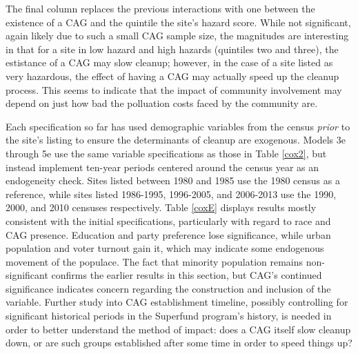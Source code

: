 \documentclass[12pt]{article}
\begin{document}
{The final column replaces the previous interactions with one between the existence of a CAG and the quintile the site's hazard score. While not significant, again likely due to such a small CAG sample size, the magnitudes are interesting in that for a site in low hazard and high hazards (quintiles two and three), the estistance of a CAG may slow cleanup; however, in the case of a site listed as very hazardous, the effect of having a CAG may actually speed up the cleanup process. This seems to indicate that the impact of community involvement may depend on just how bad the polluation costs faced by the community are. 












Each specification so far has used demographic variables from the census \emph{prior} to the site's listing to ensure the determinants of cleanup are exogenous. Models 3e through 5e use the same variable specifications as those in Table \ref{cox2}, but instead implement ten-year periods centered around the census year as an endogeneity check. Sites listed between 1980 and 1985 use the 1980 census as a reference, while sites listed 1986-1995, 1996-2005, and 2006-2013 use the 1990, 2000, and 2010 censuses respectively. Table \ref{coxE} displays results mostly consistent with the initial specifications, particularly with regard to race and CAG presence. Education and party preference lose significance, while urban population and voter turnout gain it, which may indicate some endogenous movement of the populace. The fact that minority population remains non-significant confirms the earlier results in this section, but CAG's continued significance indicates concern regarding the construction and inclusion of the variable. Further study into CAG establishment timeline, possibly controlling for significant historical periods in the Superfund program's history, is needed in order to better understand the method of impact: does a CAG itself slow cleanup down, or are such groups established after some time in order to speed things up?

}
\end{document}

